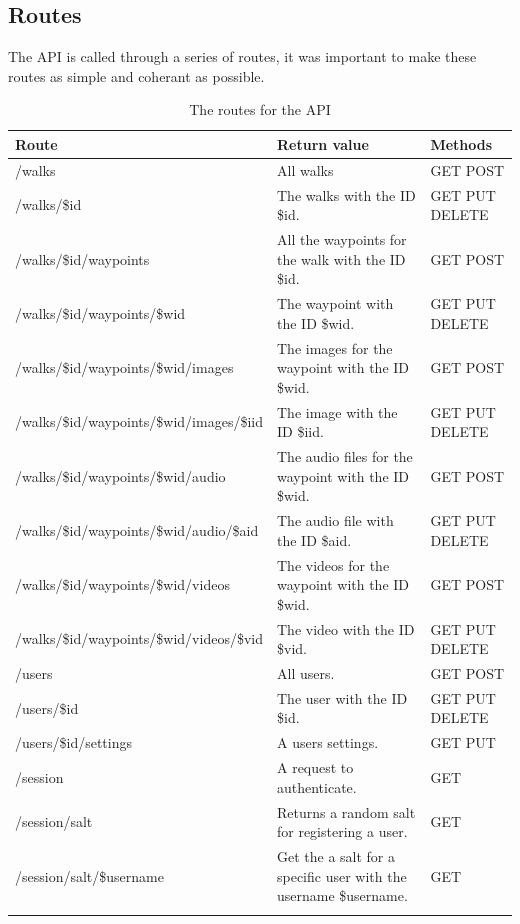 \documentclass[11pt,a4paper]{article}
\begin{document}
\subsection{Routes}

The API is called through a series of routes, it was important to make these routes as simple and coherant as possible.

\begin{longtable}{m{}|m{}|C{0.11\textwidth}}
    \textbf{Route} & \textbf{Return value} & \textbf{Methods} \\\hline
    /walks & All walks & GET POST\\ \hline
    /walks/\$id & The walks with the ID \$id. & GET PUT DELETE\\ \hline
    /walks/\$id/waypoints & All the waypoints for the walk with the ID \$id. & GET POST\\ \hline
    /walks/\$id/waypoints/\$wid & The waypoint with the ID \$wid. & GET PUT DELETE \\ \hline
    /walks/\$id/waypoints/\$wid/images & The images for the waypoint with the ID \$wid. & GET POST \\ \hline
    /walks/\$id/waypoints/\$wid/images/\$iid & The image with the ID \$iid. & GET PUT DELETE \\ \hline
    /walks/\$id/waypoints/\$wid/audio & The audio files for the waypoint with the ID \$wid. & GET POST \\ \hline
    /walks/\$id/waypoints/\$wid/audio/\$aid & The audio file with the ID \$aid. & GET PUT DELETE \\ \hline
    /walks/\$id/waypoints/\$wid/videos & The videos for the waypoint with the ID \$wid. & GET POST \\ \hline
    /walks/\$id/waypoints/\$wid/videos/\$vid & The video with the ID \$vid. & GET PUT DELETE \\ \hline
    /users & All users. & GET POST \\\hline
    /users/\$id & The user with the ID \$id. & GET PUT DELETE \\\hline
    /users/\$id/settings & A users settings. & GET PUT \\\hline
    /session & A request to authenticate. & GET\\\hline
    /session/salt & Returns a random salt for registering a user. & GET\\\hline
    /session/salt/\$username & Get the a salt for a specific user with the username \$username. & GET\\
    \caption {The routes for the API}
    \label{routes}
\end{longtable}
\end{document}
